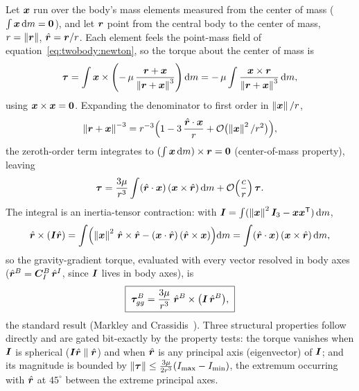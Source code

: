 Let $\bm{x}$ run over the body's mass elements measured from the center of
mass ($\int \bm{x}\,\mathrm{d}m = \bm{0}$), and let $\bm{r}$ point from the
central body to the center of mass, $r = \left\lVert \bm{r} \right\rVert$, $\hat{\bm{r}} =
\bm{r}/r$. Each element feels the point-mass field of
equation~\eqref{eq:twobody:newton}, so the torque about the center of mass
is
\begin{equation}
  \bm{\tau} = \int \bm{x} \times
    \left( -\,\mu\, \frac{\bm{r} + \bm{x}}{\left\lVert \bm{r} + \bm{x} \right\rVert^{3}}
    \right) \mathrm{d}m
  = -\,\mu \int \frac{\bm{x} \times \bm{r}}
      {\left\lVert \bm{r} + \bm{x} \right\rVert^{3}}\, \mathrm{d}m ,
  \label{eq:gravgrad:torqueint}
\end{equation}
using $\bm{x} \times \bm{x} = \bm{0}$. Expanding the denominator to first
order in $\left\lVert \bm{x} \right\rVert/r$,
\begin{equation}
  \left\lVert \bm{r} + \bm{x} \right\rVert^{-3}
    = r^{-3} \Bigl( 1 - 3\, \frac{\hat{\bm{r}} \cdot \bm{x}}{r}
      + \mathcal{O}\bigl(\left\lVert \bm{x} \right\rVert^2/r^2\bigr) \Bigr),
  \label{eq:gravgrad:expansion}
\end{equation}
the zeroth-order term integrates to $(\int \bm{x}\,\mathrm{d}m) \times
\bm{r} = \bm{0}$ (center-of-mass property), leaving
\begin{equation}
  \bm{\tau} = \frac{3\mu}{r^{3}} \int (\hat{\bm{r}} \cdot \bm{x})
    \,(\bm{x} \times \hat{\bm{r}})\, \mathrm{d}m
    + \mathcal{O}\!\left(\frac{c}{r}\right)\bm{\tau} .
  \label{eq:gravgrad:firstorder}
\end{equation}
The integral is an inertia-tensor contraction: with $\bm{I} = \int
(\left\lVert \bm{x} \right\rVert^2 \bm{I}_3 - \bm{x}\bm{x}^{\mathsf T})\,\mathrm{d}m$,
\begin{equation}
  \hat{\bm{r}} \times (\bm{I}\hat{\bm{r}})
  = \int \Bigl( \left\lVert \bm{x} \right\rVert^2\, \hat{\bm{r}} \times \hat{\bm{r}}
    - (\bm{x} \cdot \hat{\bm{r}})\, (\hat{\bm{r}} \times \bm{x})
    \Bigr) \mathrm{d}m
  = \int (\hat{\bm{r}} \cdot \bm{x})\,(\bm{x} \times \hat{\bm{r}})\,
    \mathrm{d}m ,
  \label{eq:gravgrad:identity}
\end{equation}
so the gravity-gradient torque, evaluated with every vector resolved in
body axes ($\hat{\bm{r}}^{B} = \bm{C}_{I}^{B}\,\hat{\bm{r}}^{I}$, since
$\bm{I}$ lives in body axes), is
\begin{equation}
  \boxed{\;
  \bm{\tau}^{B}_{gg}
    = \frac{3\mu}{r^{3}}\;
      \hat{\bm{r}}^{B} \times \bigl( \bm{I}\, \hat{\bm{r}}^{B} \bigr) ,
  \;}
  \label{eq:gravgrad:torque}
\end{equation}
the standard result (Markley and Crassidis~\cite{markley2014}). Three
structural properties follow directly and are gated bit-exactly by the
property tests: the torque vanishes when $\bm{I}$ is spherical
($\bm{I}\hat{\bm{r}} \parallel \hat{\bm{r}}$) and when $\hat{\bm{r}}$ is
any principal axis (eigenvector) of $\bm{I}$; and its magnitude is
bounded by $\left\lVert \bm{\tau} \right\rVert \le \tfrac{3\mu}{2r^{3}}
(I_{\max} - I_{\min})$, the extremum occurring with $\hat{\bm{r}}$ at
$45^{\circ}$ between the extreme principal axes.

